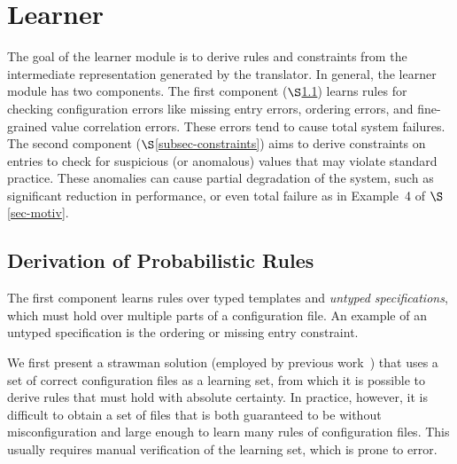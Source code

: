 \section{Learner}
\label{sec-learn}


The goal of the learner module is to derive rules and constraints from
the intermediate representation generated by the translator.
In general, the learner module has two components.
The first component ($\S$\ref{subsec-rules}) 
learns rules for checking configuration errors like
missing entry errors, ordering errors, and fine-grained value correlation errors. 
These errors tend to cause total system failures.
The second component ($\S$\ref{subsec-constraints}) 
aims to derive 
constraints on entries to check for suspicious (or anomalous) values 
that may violate standard practice. These anomalies can cause partial 
degradation of the system, 
such as significant reduction in performance, or even 
total failure as in Example~4 of $\S$\ref{sec-motiv}.

\subsection{Derivation of Probabilistic Rules}
\label{subsec-rules}

The first component learns rules over typed templates and \emph{untyped specifications}, 
which must hold over multiple parts of a configuration file. An example of an
untyped specification is the ordering or missing entry constraint.

We first present a strawman solution (employed by
previous work~\cite{santolucitoCAV, zhang14encore}) that uses 
a set of correct configuration files as a learning set, 
from which it is possible to derive rules 
that must hold with absolute certainty. 
In practice, however, it is difficult to obtain a set of files 
that is both guaranteed to be without misconfiguration 
and large enough to learn many rules of configuration files.
This usually requires manual verification of the learning set, 
which is prone to error.

